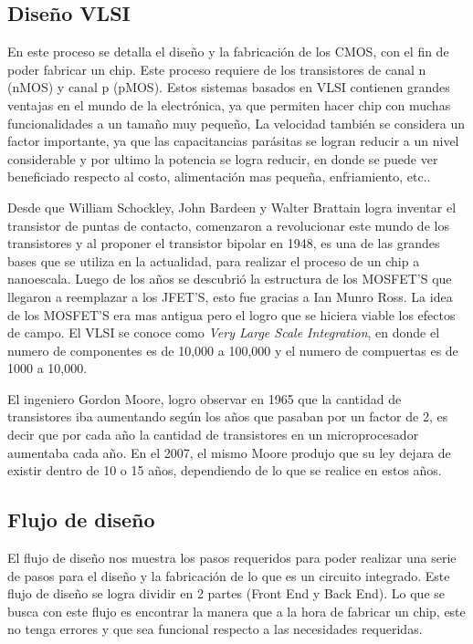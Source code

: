 \subsection*{Diseño VLSI}

En este proceso se detalla el diseño y la fabricación de los CMOS, con el fin de poder fabricar un chip. Este proceso requiere de los transistores de canal n (nMOS) y canal p (pMOS).
Estos sistemas basados en VLSI contienen grandes ventajas en el mundo de la electrónica, ya que permiten hacer chip con muchas funcionalidades a un tamaño muy pequeño, La velocidad también se considera un factor importante, ya que las capacitancias parásitas se logran reducir a un nivel considerable y por ultimo la potencia se logra reducir, en donde se puede ver beneficiado respecto al costo, alimentación mas pequeña, enfriamiento, etc..

Desde que William Schockley, John Bardeen y Walter Brattain logra inventar el transistor de puntas de contacto, comenzaron a revolucionar este mundo de los transistores y al proponer el transistor bipolar en 1948, es una de las grandes bases que se utiliza en la actualidad, para realizar el proceso de un chip a nanoescala. 
Luego de los años se descubrió la estructura de los MOSFET'S que llegaron a reemplazar a los JFET'S, esto fue gracias a Ian Munro Ross. La idea  de los MOSFET'S era mas antigua pero el logro que se hiciera viable los efectos de campo.
El VLSI se conoce como \textit{Very Large Scale Integration}, en donde el numero de componentes es de 10,000 a 100,000 y el numero de compuertas es de 1000 a 10,000. 

El ingeniero Gordon Moore, logro observar en 1965 que la cantidad de transistores iba aumentando según los años que pasaban por un factor de 2, es decir que por cada año la cantidad de transistores en un microprocesador aumentaba cada año. En el 2007, el mismo Moore produjo que su ley dejara de existir dentro de 10 o 15 años, dependiendo de lo que se realice en estos años.
\cite{hoover2010bio} \cite{park2014design}
\vspace{15mm}

\subsection*{Flujo de diseño}

El flujo de diseño nos muestra los pasos requeridos para poder realizar una serie de pasos para el diseño y la fabricación de lo que es un circuito integrado. Este flujo de diseño se logra dividir en 2 partes (Front End y Back End). Lo que se busca con este flujo es encontrar la manera que a la hora de fabricar un chip, este no tenga errores y que sea funcional respecto a las necesidades requeridas.


